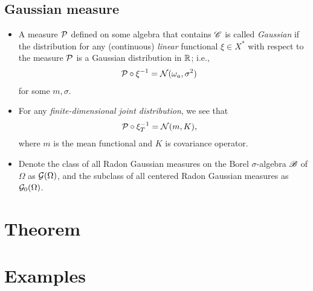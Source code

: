 \documentclass[11pt]{article}
\begin{document}
\subsection{Gaussian measure}
\begin{itemize}
\item A measure ${\mathcal P}$ defined on some algebra that contains ${\mathscr C}$ is called \emph{Gaussian} if the distribution for any (continuous) \emph{linear} functional $\xi \in X^{*}$ with respect to the measure ${\mathcal P}$ is a Gaussian distribution in ${\mathbb R}$; i.e., 
\begin{align}
{\mathcal P}\circ \xi^{-1} &= {\mathcal N}(\omega_{a}, \sigma^{2}) \label{expr: Gaussian_measure}
\end{align}
for some $m, \sigma$.

\item For any \emph{finite-dimensional joint distribution}, we see that 
\begin{align}
{\mathcal P}\circ \xi_{T}^{-1} &= {\mathcal N}(m, K),
\end{align}
where $m$ is the mean functional and $K$ is covariance operator. 

\item Denote the class of all Radon Gaussian measures on the Borel $\sigma$-algebra ${\mathscr B}$ of $\Omega$ as ${\mathcal G}(\Omega)$, and the subclass of all centered Radon Gaussian measures as ${\mathcal G}_{0}(\Omega)$.

\end{itemize}
\newpage
\section{Theorem}

\newpage
\section{Examples}
\newpage


\end{document}
